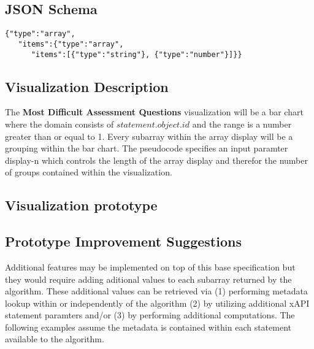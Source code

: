 \documentclass{article}
\begin{document}
\subsection{JSON Schema}

\begin{lstlisting}[]
{"type":"array",
   "items":{"type":"array",
      "items":[{"type":"string"}, {"type":"number"}]}}
\end{lstlisting}

\subsection{Visualization Description}
The \textbf{Most Difficult Assessment Questions} visualization will be
a bar chart where the domain consists of $statement.object.id$ and the
range is a number greater than or equal to 1. Every subarray within
the array display will be a grouping within the bar chart. The
pseudocode specifies an input paramter display-n which controls the
length of the array display and therefor the number of groups contained within
the visualization.


\subsection{Visualization prototype}



\subsection{Prototype Improvement Suggestions}
Additional features may be implemented on top of this base
specification but they would require adding aditional values to each
subarray returned by the algorithm. These additional values can be
retrieved via (1) performing metadata lookup within or independently
of the algorithm (2) by utilizing additional xAPI statement paramters
and/or (3) by performing additional computations. The following
examples assume the metadata is contained within each statement
available to the algorithm.
\end{document}
